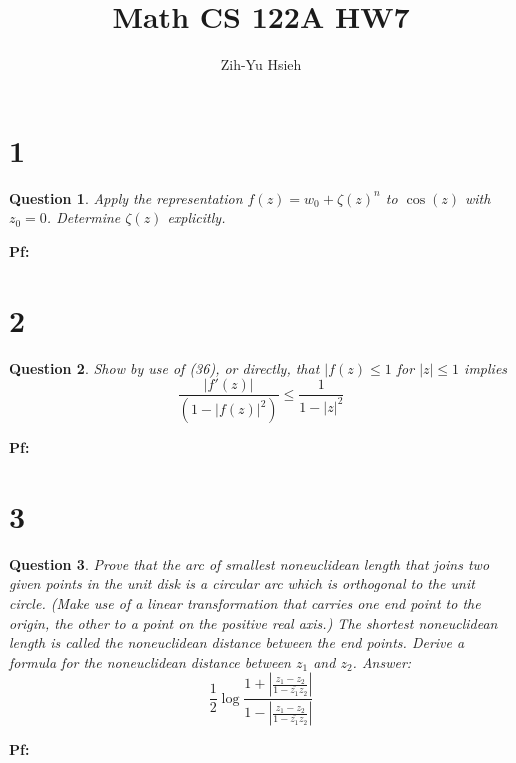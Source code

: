 \documentclass{article}
\title{Math CS 122A HW7}
\author{Zih-Yu Hsieh}
\newtheorem{question}{Question}
\begin{document}
\maketitle

\section*{1}
\begin{myBox}[]{}
    \begin{question}
        Apply the representation $f(z) = w_0+\zeta(z)^n$ to $\cos(z)$ with $z_0=0$.
        Determine $\zeta(z)$ explicitly.
    \end{question}
\end{myBox}

\textbf{Pf:}

\break

\section*{2}
\begin{myBox}[]{}
    \begin{question}
        Show by use of (36), or directly, that $|f(z)\leq 1$ for $|z|\leq 1$ implies
        $$\frac{|f'(z)|}{(1-|f(z)|^2)}\leq \frac{1}{1-|z|^2}$$
    \end{question}
\end{myBox}

\textbf{Pf:}

\break

\section*{3}
\begin{myBox}[]{}
    \begin{question}
        Prove that the arc of smallest noneuclidean length that joins two
        given points in the unit disk is a circular arc which is orthogonal to the unit
        circle. (Make use of a linear transformation that carries one end point
        to the origin, the other to a point on the positive real axis.)
        The shortest noneuclidean length is called the noneuclidean distance
        between the end points. Derive a formula for the noneuclidean distance
        between $z_1$ and $z_2$. Answer:
        $$\frac{1}{2}\log\frac{1+\left|\frac{z_1-z_2}{1-\bar{z_1}z_2}\right|}{1-\left|\frac{z_1-z_2}{1-\bar{z_1}z_2}\right|}$$
    \end{question}
\end{myBox}

\textbf{Pf:}
\end{document}
